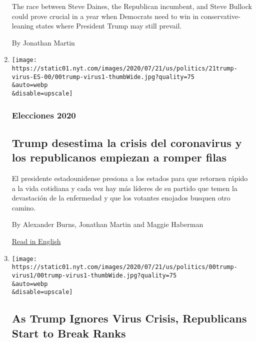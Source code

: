 \begin{enumerate}
  The race between Steve Daines, the Republican incumbent, and Steve
  Bullock could prove crucial in a year when Democrats need to win in
  conservative-leaning states where President Trump may still prevail.

  By Jonathan Martin
\item
  \href{/es/2020/07/21/espanol/estados-unidos/donald-trump-coronavirus-republicanos.html}{}

  \texttt{[image: https://static01.nyt.com/images/2020/07/21/us/politics/21trump-virus-ES-00/00trump-virus1-thumbWide.jpg?quality=75\\\&auto=webp\\\&disable=upscale]}

  \hypertarget{elecciones-2020}{%
  \subsubsection{Elecciones 2020}\label{elecciones-2020}}

  \hypertarget{trump-desestima-la-crisis-del-coronavirus-y-los-republicanos-empiezan-a-romper-filas}{%
  \subsection{Trump desestima la crisis del coronavirus y los
  republicanos empiezan a romper
  filas}\label{trump-desestima-la-crisis-del-coronavirus-y-los-republicanos-empiezan-a-romper-filas}}

  El presidente estadounidense presiona a los estados para que retornen
  rápido a la vida cotidiana y cada vez hay más líderes de su partido
  que temen la devastación de la enfermedad y que los votantes enojados
  busquen otro camino.

  By Alexander Burns, Jonathan Martin and Maggie Haberman

  \href{https://www.nytimes.com/2020/07/19/us/politics/republicans-contradict-trump-coronavirus.html}{Read
  in English}
\item
  \href{/2020/07/19/us/politics/republicans-contradict-trump-coronavirus.html}{}

  \texttt{[image: https://static01.nyt.com/images/2020/07/21/us/politics/00trump-virus1/00trump-virus1-thumbWide.jpg?quality=75\\\&auto=webp\\\&disable=upscale]}

  \hypertarget{as-trump-ignores-virus-crisis-republicans-start-to-break-ranks}{%
  \subsection{As Trump Ignores Virus Crisis, Republicans Start to Break
  Ranks}\label{as-trump-ignores-virus-crisis-republicans-start-to-break-ranks}}


\end{enumerate}
